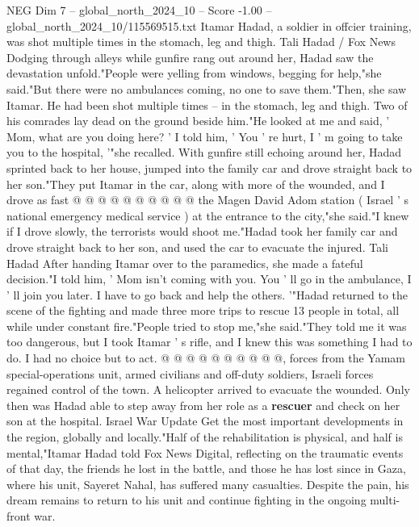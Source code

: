 \begin{textsample}{NEG Dim 7 – global\_north\_2024\_10 – Score -1.00 – global\_north\_2024\_10/115569515.txt}  \label{ex:f7_neg_360}
Itamar Hadad, a soldier in offcier training, was shot multiple times in the stomach, leg and thigh.
Tali Hadad / Fox News Dodging through alleys while gunfire rang out around her, Hadad saw the devastation unfold."People were yelling from windows, begging for help,"she said."But there were no ambulances coming, no one to save them."Then, she saw Itamar.
He had been shot multiple times -- in the stomach, leg and thigh.
Two of his comrades lay dead on the ground beside him."He looked at me and said, ' Mom, what are you doing here? ' I told him, ' You ' re hurt, I ' m going to take you to the hospital, '"she recalled.
With gunfire still echoing around her, Hadad sprinted back to her house, jumped into the family car and drove straight back to her son."They put Itamar in the car, along with more of the wounded, and I drove as fast @ @ @ @ @ @ @ @ @ @ the Magen David Adom station ( Israel ' s national emergency medical service ) at the entrance to the city,"she said."I knew if I drove slowly, the terrorists would shoot me."Hadad took her family car and drove straight back to her son, and used the car to evacuate the injured.
Tali Hadad After handing Itamar over to the paramedics, she made a fateful decision."I told him, ' Mom isn't coming with you.
You ' ll go in the ambulance, I ' ll join you later.
I have to go back and help the others. '"Hadad returned to the scene of the fighting and made three more trips to rescue 13 people in total, all while under constant fire."People tried to stop me,"she said."They told me it was too dangerous, but I took Itamar ' s rifle, and I knew this was something I had to do.
I had no choice but to act. @ @ @ @ @ @ @ @ @ @, forces from the Yamam special-operations unit, armed civilians and off-duty soldiers, Israeli forces regained control of the town.
A helicopter arrived to evacuate the wounded.
Only then was Hadad able to step away from her role as a \textbf{rescuer} and check on her son at the hospital.
Israel War Update Get the most important developments in the region, globally and locally."Half of the rehabilitation is physical, and half is mental,"Itamar Hadad told Fox News Digital, reflecting on the traumatic events of that day, the friends he lost in the battle, and those he has lost since in Gaza, where his unit, Sayeret Nahal, has suffered many casualties.
Despite the pain, his dream remains to return to his unit and continue fighting in the ongoing multi-front war.

\end{textsample}
